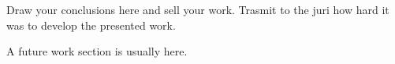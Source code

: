 Draw your conclusions here and sell your work. Trasmit to the juri how hard it was to develop the presented work.

A future work section is usually here.

\cleardoublepage
 
